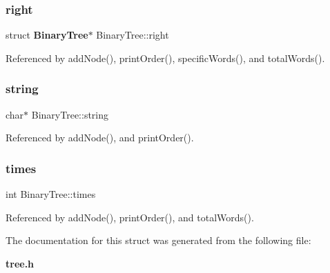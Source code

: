 \subsubsection{right}
{\footnotesize\ttfamily struct \textbf{ Binary\+Tree}$\ast$ Binary\+Tree\+::right}



Referenced by add\+Node(), print\+Order(), specific\+Words(), and total\+Words().

\mbox{\label{structBinaryTree_abd1b565023c9970c507dd2d0bbc01e68}} 
\subsubsection{string}
{\footnotesize\ttfamily char$\ast$ Binary\+Tree\+::string}



Referenced by add\+Node(), and print\+Order().

\mbox{\label{structBinaryTree_a946fd2f76286ea5452c65640bbc27a1b}} 
\subsubsection{times}
{\footnotesize\ttfamily int Binary\+Tree\+::times}



Referenced by add\+Node(), print\+Order(), and total\+Words().



The documentation for this struct was generated from the following file\+:\begin{DoxyCompactItemize}
\item 
\textbf{ tree.\+h}\end{DoxyCompactItemize}

